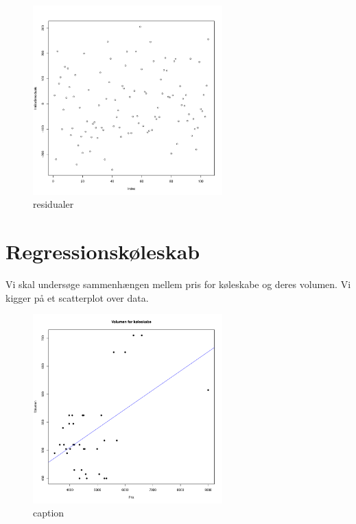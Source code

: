 \documentclass{article}
\begin{document}
\begin{figure}[h]
  \centering
  \includegraphics[width=0.65\textwidth]{../residualer.pdf}
  \caption{residualer}
\end{figure}


\section{Regressionskøleskab}

Vi skal undersøge sammenhængen mellem pris for køleskabe og deres volumen. Vi
kigger på et scatterplot over data.

\begin{figure}[H]
  \centering
  \includegraphics[width=0.65\textwidth]{../fridge_plot.pdf}
  \caption{caption}
\end{figure}
\end{document}
